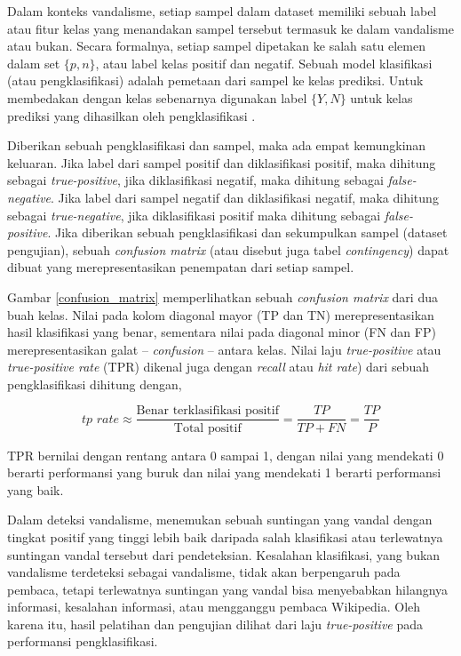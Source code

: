
Dalam konteks vandalisme, setiap sampel dalam dataset memiliki sebuah label
atau fitur kelas yang menandakan sampel tersebut termasuk ke dalam vandalisme
atau bukan.
Secara formalnya, setiap sampel dipetakan ke salah satu elemen dalam set
$\{p, n\}$, atau label kelas positif dan negatif.
Sebuah model klasifikasi (atau pengklasifikasi) adalah pemetaan dari sampel ke
kelas prediksi.
Untuk membedakan dengan kelas sebenarnya digunakan label $\{Y, N\}$ untuk kelas
prediksi yang dihasilkan oleh pengklasifikasi
\parencite{fawcett2006introduction}.

Diberikan sebuah pengklasifikasi dan sampel, maka ada empat kemungkinan
keluaran.
Jika label dari sampel positif dan diklasifikasi positif, maka dihitung sebagai
\textit{true-positive}, jika diklasifikasi negatif, maka dihitung sebagai
\textit{false-negative}.
Jika label dari sampel negatif dan diklasifikasi negatif, maka dihitung sebagai
\textit{true-negative}, jika diklasifikasi positif maka dihitung sebagai
\textit{false-positive}.
Jika diberikan sebuah pengklasifikasi dan sekumpulkan sampel (dataset
pengujian), sebuah \textit{confusion matrix} (atau disebut juga tabel
\textit{contingency}) dapat dibuat yang merepresentasikan penempatan dari
setiap sampel.



Gambar \ref{confusion_matrix} memperlihatkan sebuah \textit{confusion matrix}
dari dua buah kelas.
Nilai pada kolom diagonal mayor (TP dan TN) merepresentasikan hasil klasifikasi
yang benar, sementara nilai pada diagonal minor (FN dan FP) merepresentasikan
galat -- \textit{confusion} -- antara kelas.
Nilai laju \textit{true-positive} atau \textit{true-positive rate} (TPR)
dikenal juga dengan \textit{recall} atau \textit{hit rate}) dari sebuah
pengklasifikasi dihitung dengan,

\begin{equation}
	\textit{tp rate} \approx \frac{\text{Benar terklasifikasi positif}}%
		{\text{Total positif}}
		= \frac{TP}{TP + FN}
		= \frac{TP}{P}
\end{equation}

TPR bernilai dengan rentang antara 0 sampai 1, dengan nilai yang mendekati 0
berarti performansi yang buruk dan nilai yang mendekati 1 berarti performansi
yang baik.


Dalam deteksi vandalisme, menemukan sebuah suntingan yang vandal dengan tingkat
positif yang tinggi lebih baik daripada salah klasifikasi atau terlewatnya
suntingan vandal tersebut dari pendeteksian.
Kesalahan klasifikasi, yang bukan vandalisme terdeteksi sebagai vandalisme,
tidak akan berpengaruh pada pembaca, tetapi terlewatnya suntingan yang vandal
bisa menyebabkan hilangnya informasi, kesalahan informasi, atau mengganggu
pembaca Wikipedia.
Oleh karena itu, hasil pelatihan dan pengujian dilihat dari laju
\textit{true-positive} pada performansi pengklasifikasi.
